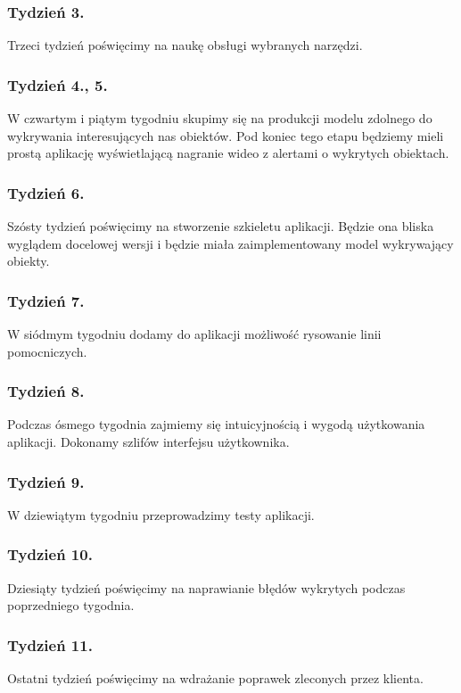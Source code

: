     \subsubsection*{Tydzień 3.}
    Trzeci tydzień poświęcimy na naukę obsługi wybranych narzędzi.

    \subsubsection*{Tydzień 4., 5.}
    W czwartym i piątym tygodniu skupimy się na produkcji modelu zdolnego do wykrywania 
    interesujących nas obiektów. Pod koniec tego etapu będziemy mieli prostą aplikację
    wyświetlającą nagranie wideo z alertami o wykrytych obiektach.

    \subsubsection*{Tydzień 6.}
    Szósty tydzień poświęcimy na stworzenie szkieletu aplikacji.
    Będzie ona bliska wyglądem docelowej wersji i będzie miała zaimplementowany
    model wykrywający obiekty.

    \subsubsection*{Tydzień 7.}
    W siódmym tygodniu dodamy do aplikacji możliwość rysowanie linii pomocniczych.

    \subsubsection*{Tydzień 8.}
    Podczas ósmego tygodnia zajmiemy się intuicyjnością i wygodą użytkowania aplikacji.
    Dokonamy szlifów interfejsu użytkownika.
    
    \subsubsection*{Tydzień 9.}
    W dziewiątym tygodniu przeprowadzimy testy aplikacji.
    
    \subsubsection*{Tydzień 10.}
    Dziesiąty tydzień poświęcimy na naprawianie błędów wykrytych podczas poprzedniego tygodnia.

    \subsubsection*{Tydzień 11.}
    Ostatni tydzień poświęcimy na wdrażanie poprawek zleconych przez klienta.